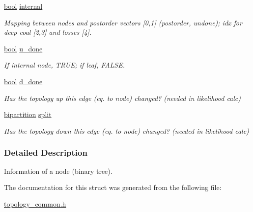 \begin{DoxyCompactItemize}
\mbox{\label{structtopol__node__struct_a0d9191d12975f8876bf490ab1ae9285b}} 
\hyperlink{lowlevel_8h_a97a80ca1602ebf2303258971a2c938e2}{bool} \hyperlink{structtopol__node__struct_a0d9191d12975f8876bf490ab1ae9285b}{internal}
\begin{DoxyCompactList}\small\item\em Mapping between nodes and postorder vectors \mbox{[}0,1\mbox{]} (postorder, undone); idx for deep coal \mbox{[}2,3\mbox{]} and losses \mbox{[}4\mbox{]}. \end{DoxyCompactList}\item 
\mbox{\label{structtopol__node__struct_abb2445a6e496485e310620d4cb23fc3f}} 
\hyperlink{lowlevel_8h_a97a80ca1602ebf2303258971a2c938e2}{bool} \hyperlink{structtopol__node__struct_abb2445a6e496485e310620d4cb23fc3f}{u\+\_\+done}
\begin{DoxyCompactList}\small\item\em If internal node, T\+R\+UE; if leaf, F\+A\+L\+SE. \end{DoxyCompactList}\item 
\mbox{\label{structtopol__node__struct_a8a18b8003f8534d99a5b9936b652c8a4}} 
\hyperlink{lowlevel_8h_a97a80ca1602ebf2303258971a2c938e2}{bool} \hyperlink{structtopol__node__struct_a8a18b8003f8534d99a5b9936b652c8a4}{d\+\_\+done}
\begin{DoxyCompactList}\small\item\em Has the topology up this edge (eq. to node) changed? (needed in likelihood calc) \end{DoxyCompactList}\item 
\mbox{\label{structtopol__node__struct_aab1db55910dcf5f4e8b3d451aa0a8422}} 
\hyperlink{structbipartition__struct}{bipartition} \hyperlink{structtopol__node__struct_aab1db55910dcf5f4e8b3d451aa0a8422}{split}
\begin{DoxyCompactList}\small\item\em Has the topology down this edge (eq. to node) changed? (needed in likelihood calc) \end{DoxyCompactList}\end{DoxyCompactItemize}


\subsubsection{Detailed Description}
Information of a node (binary tree). 

The documentation for this struct was generated from the following file\+:\begin{DoxyCompactItemize}
\item 
\hyperlink{topology__common_8h}{topology\+\_\+common.\+h}\end{DoxyCompactItemize}

